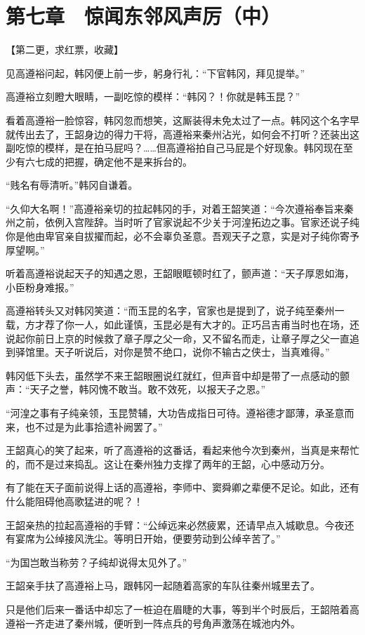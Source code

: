 \section{第七章　惊闻东邻风声厉（中）}

【第二更，求红票，收藏】

见高遵裕问起，韩冈便上前一步，躬身行礼：“下官韩冈，拜见提举。”

高遵裕立刻瞪大眼睛，一副吃惊的模样：“韩冈？！你就是韩玉昆？”

看着高遵裕一脸惊容，韩冈忽而想笑，这厮装得未免太过了一点。韩冈这个名字早就传出去了，王韶身边的得力干将，高遵裕来秦州沾光，如何会不打听？还装出这副吃惊的模样，是在拍马屁吗？……但高遵裕拍自己马屁是个好现象。韩冈现在至少有六七成的把握，确定他不是来拆台的。

“贱名有辱清听。”韩冈自谦着。

“久仰大名啊！”高遵裕亲切的拉起韩冈的手，对着王韶笑道：“今次遵裕奉旨来秦州之前，依例入宫陛辞。当时听了官家说起不少关于河湟拓边之事。官家还说子纯你是他由卑官亲自拔擢而起，必不会辜负圣意。吾观天子之意，实是对子纯你寄予厚望啊。”

听着高遵裕说起天子的知遇之恩，王韶眼眶顿时红了，颤声道：“天子厚恩如海，小臣粉身难报。”

高遵裕转头又对韩冈笑道：“而玉昆的名字，官家也是提到了，说子纯至秦州一载，方才荐了你一人，如此谨慎，玉昆必是有大才的。正巧吕吉甫当时也在场，还说起你前日上京的时候救了章子厚之父一命，又不留名而走，让章子厚之父一直追到驿馆里。天子听说后，对你是赞不绝口，说你不输古之侠士，当真难得。”

韩冈低下头去，虽然学不来王韶眼圈说红就红，但声音中却是带了一点感动的颤声：“天子之誉，韩冈愧不敢当。敢不效死，以报天子之恩。”

“河湟之事有子纯亲领，玉昆赞辅，大功告成指日可待。遵裕德才鄙薄，承圣意而来，也不过是为此事拾遗补阙罢了。”

王韶真心的笑了起来，听了高遵裕的这番话，看起来他今次到秦州，当真是来帮忙的，而不是过来捣乱。这让在秦州独力支撑了两年的王韶，心中感动万分。

有了能在天子面前说得上话的高遵裕，李师中、窦舜卿之辈便不足论。如此，还有什么能阻碍他高歌猛进的呢？！

王韶亲热的拉起高遵裕的手臂：“公绰远来必然疲累，还请早点入城歇息。今夜还有宴席为公绰接风洗尘。等明日开始，便要劳动到公绰辛苦了。”

“为国岂敢当称劳？子纯却说得太见外了。”

王韶亲手扶了高遵裕上马，跟韩冈一起随着高家的车队往秦州城里去了。

只是他们后来一番话中却忘了一桩迫在眉睫的大事，等到半个时辰后，王韶陪着高遵裕一齐走进了秦州城，便听到一阵点兵的号角声激荡在城池内外。

